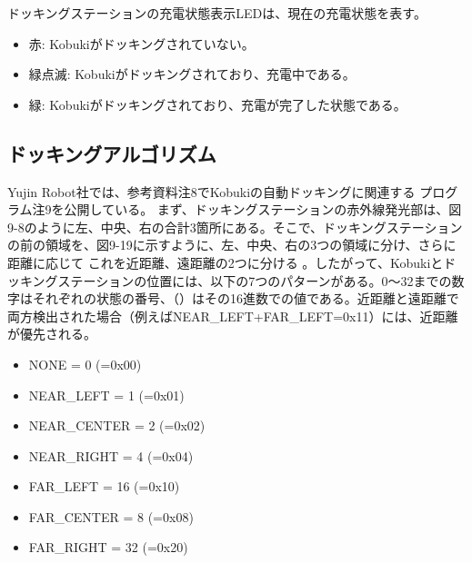 \begin{itemize}
\begin{exercise}[Kobukiとドッキングステーションの状態表示LED]
  ドッキングステーションの充電状態表示LEDは、現在の充電状態を表す。

  \begin{itemize}
  \item 赤: Kobukiがドッキングされていない。
  \item 緑点滅: Kobukiがドッキングされており、充電中である。
  \item 緑: Kobukiがドッキングされており、充電が完了した状態である。
  \end{itemize}
\end{exercise}

\subsection{ドッキングアルゴリズム}

Yujin Robot社では、参考資料注8でKobukiの自動ドッキングに関連する  プログラム注9を公開している。
まず、ドッキングステーションの赤外線発光部は、図9-8のように左、中央、右の合計3箇所にある。そこで、ドッキングステーションの前の領域を、図9-19に示すように、左、中央、右の3つの領域に分け、さらに距離に応じて   これを近距離、遠距離の2つに分ける  。したがって、Kobukiとドッキングステーションの位置には、以下の7つのパターンがある。0～32までの数字はそれぞれの状態の番号、（）はその16進数での値である。近距離と遠距離で両方検出された場合（例えばNEAR\_LEFT+FAR\_LEFT=0x11）には、近距離が優先される。

\begin{itemize}[leftmargin=*]
\item NONE = 0  (=0x00)
\item NEAR\_LEFT = 1 (=0x01)
\item NEAR\_CENTER = 2 (=0x02)
\item NEAR\_RIGHT = 4 (=0x04)
\item FAR\_LEFT = 16 (=0x10)
\item FAR\_CENTER = 8 (=0x08)
\item FAR\_RIGHT = 32 (=0x20)
\end{itemize}


\end{itemize}
